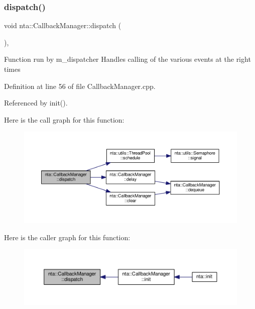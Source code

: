 \subsubsection{\texorpdfstring{dispatch()}{dispatch()}}
{\footnotesize\ttfamily void nta\+::\+Callback\+Manager\+::dispatch (\begin{DoxyParamCaption}{ }\end{DoxyParamCaption})\hspace{0.3cm}{\ttfamily [static]}, {\ttfamily [private]}}

Function run by m\+\_\+dispatcher Handles calling of the various events at the right times 

Definition at line 56 of file Callback\+Manager.\+cpp.



Referenced by init().

Here is the call graph for this function\+:
\nopagebreak
\begin{figure}[H]
\begin{center}
\leavevmode
\includegraphics[width=350pt]{d1/de6/classnta_1_1CallbackManager_a7912dc908d7a7a44267ddd8fa6fb8686_cgraph}
\end{center}
\end{figure}
Here is the caller graph for this function\+:
\nopagebreak
\begin{figure}[H]
\begin{center}
\leavevmode
\includegraphics[width=350pt]{d1/de6/classnta_1_1CallbackManager_a7912dc908d7a7a44267ddd8fa6fb8686_icgraph}
\end{center}
\end{figure}
\mbox{\label{classnta_1_1CallbackManager_a1fd6132e79e49dbcb787bc8a8507a931}} 
